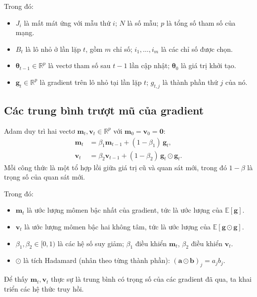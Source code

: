 Trong đó:
\begin{itemize}
  \item $J_i$ là mất mát ứng với mẫu thứ $i$; $N$ là số mẫu; $p$ là tổng số tham số của mạng.
  \item $B_t$ là lô nhỏ ở lần lặp $t$, gồm $m$ chỉ số; $i_1,\dots,i_m$ là các chỉ số được chọn.
  \item $\boldsymbol{\theta}_{t-1}\in\mathbb{R}^{p}$ là vectơ tham số sau $t-1$ lần cập nhật; $\boldsymbol{\theta}_0$ là giá trị khởi tạo.
  \item $\mathbf{g}_t\in\mathbb{R}^{p}$ là gradient trên lô nhỏ tại lần lặp $t$; $g_{t,j}$ là thành phần thứ $j$ của nó.
\end{itemize}

\subsection{Các trung bình trượt mũ của gradient}

Adam duy trì hai vectơ $\mathbf{m}_t,\mathbf{v}_t\in\mathbb{R}^{p}$ với $\mathbf{m}_0=\mathbf{v}_0=\mathbf{0}$:
\begin{align}
  \mathbf{m}_t&=\beta_1\mathbf{m}_{t-1}+(1-\beta_1)\,\mathbf{g}_t, \label{eq:adam-m}\\
  \mathbf{v}_t&=\beta_2\mathbf{v}_{t-1}+(1-\beta_2)\,\mathbf{g}_t\odot\mathbf{g}_t. \label{eq:adam-v}
\end{align}
Mỗi công thức là một tổ hợp lồi giữa giá trị cũ và quan sát mới, trong đó $1-\beta$ là trọng số của quan sát mới.

Trong đó:
\begin{itemize}
  \item $\mathbf{m}_t$ là ước lượng mômen bậc nhất của gradient, tức là ước lượng của $\mathbb{E}[\mathbf{g}]$.
  \item $\mathbf{v}_t$ là ước lượng mômen bậc hai không tâm, tức là ước lượng của $\mathbb{E}[\mathbf{g}\odot\mathbf{g}]$.
  \item $\beta_1,\beta_2\in[0,1)$ là các hệ số suy giảm; $\beta_1$ điều khiển $\mathbf{m}_t$, $\beta_2$ điều khiển $\mathbf{v}_t$.
  \item $\odot$ là tích Hadamard (nhân theo từng thành phần): $(\mathbf{a}\odot\mathbf{b})_j=a_jb_j$.
\end{itemize}

Để thấy $\mathbf{m}_t,\mathbf{v}_t$ thực sự là trung bình có trọng số của các gradient đã qua, ta khai triển các hệ thức truy hồi.

